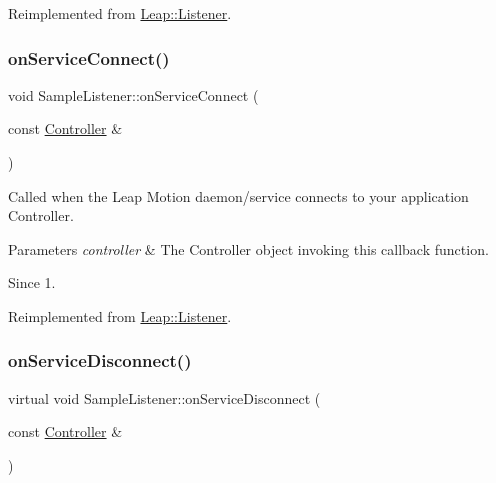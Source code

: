 Reimplemented from \hyperlink{class_leap_1_1_listener_aa9cc3f35ba72e58dc45cac415b9253f7}{Leap\+::\+Listener}.

\mbox{\label{class_sample_listener_a498412bdb417e605587ce25e836ff793}} 
\subsubsection{\texorpdfstring{on\+Service\+Connect()}{onServiceConnect()}\hspace{0.1cm}{\footnotesize\ttfamily [2/2]}}
{\footnotesize\ttfamily void Sample\+Listener\+::on\+Service\+Connect (\begin{DoxyParamCaption}\item[{const \hyperlink{class_leap_1_1_controller}{Controller} \&}]{ }\end{DoxyParamCaption})\hspace{0.3cm}{\ttfamily [virtual]}}

Called when the Leap Motion daemon/service connects to your application Controller.


\begin{DoxyCodeInclude}
\end{DoxyCodeInclude}



\begin{DoxyParams}{Parameters}
{\em controller} & The Controller object invoking this callback function. \\
\hline
\end{DoxyParams}
\begin{DoxySince}{Since}
1. 
\end{DoxySince}


Reimplemented from \hyperlink{class_leap_1_1_listener_aa9cc3f35ba72e58dc45cac415b9253f7}{Leap\+::\+Listener}.

\mbox{\label{class_sample_listener_a60f017a145fbad1dd41b1d171a7a8c69}} 
\subsubsection{\texorpdfstring{on\+Service\+Disconnect()}{onServiceDisconnect()}\hspace{0.1cm}{\footnotesize\ttfamily [1/2]}}
{\footnotesize\ttfamily virtual void Sample\+Listener\+::on\+Service\+Disconnect (\begin{DoxyParamCaption}\item[{const \hyperlink{class_leap_1_1_controller}{Controller} \&}]{ }\end{DoxyParamCaption})\hspace{0.3cm}{\ttfamily [virtual]}}

